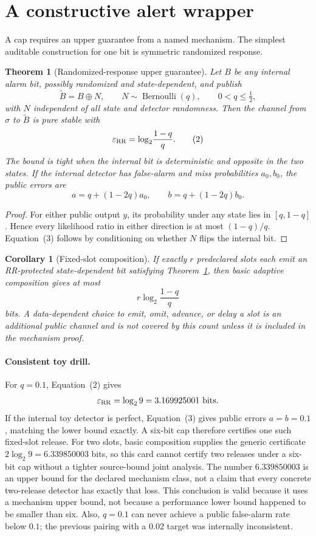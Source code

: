\documentclass[11pt]{article}
\newtheorem{theorem}{Theorem}
\newtheorem{corollary}{Corollary}
\begin{document}
\section{A constructive alert wrapper}

A cap requires an upper guarantee from a named mechanism.
The simplest auditable construction for one bit is symmetric randomized response.\cite{warner1965randomizedresponse}

\begin{theorem}[Randomized-response upper guarantee]
\label{thm:rr}
Let $B$ be any internal alarm bit, possibly randomized and state-dependent, and publish
\[
\widetilde B=B\oplus N,
\qquad N\sim\operatorname{Bernoulli}(q),
\qquad 0<q\le\tfrac12,
\]
with $N$ independent of all state and detector randomness.
Then the channel from $\sigma$ to $\widetilde B$ is pure stable with
\[
\varepsilon_{\rm RR}=\log_2\!\frac{1-q}{q}.
\tag{2}
\]
The bound is tight when the internal bit is deterministic and opposite in the two states.
If the internal detector has false-alarm and miss probabilities $a_0,b_0$, the public errors are
\[
a=q+(1-2q)a_0,
\qquad
b=q+(1-2q)b_0.
\tag{3}
\]
\end{theorem}

\begin{proof}
For either public output $y$, its probability under any state lies in $[q,1-q]$.
Hence every likelihood ratio in either direction is at most $(1-q)/q$.
Equation~(3) follows by conditioning on whether $N$ flips the internal bit.
\end{proof}

\begin{corollary}[Fixed-slot composition]
If exactly $r$ predeclared slots each emit an RR-protected state-dependent bit satisfying Theorem~\ref{thm:rr}, then basic adaptive composition gives at most
\[
r\log_2\!\frac{1-q}{q}
\]
bits.
A data-dependent choice to emit, omit, advance, or delay a slot is an additional public channel and is not covered by this count unless it is included in the mechanism proof.
\end{corollary}

\paragraph{Consistent toy drill.}
For $q=0.1$, Equation~(2) gives
\[
\varepsilon_{\rm RR}=\log_2 9=3.169925001\text{ bits}.
\]
If the internal toy detector is perfect, Equation~(3) gives public errors $a=b=0.1$, matching the lower bound exactly.
A six-bit cap therefore certifies one such fixed-slot release.  For two slots, basic composition supplies the generic certificate
$2\log_2 9=6.339850003$ bits, so this card cannot certify two releases under a six-bit cap without a tighter source-bound joint analysis.
The number $6.339850003$ is an upper bound for the declared mechanism class, not a claim that every concrete two-release detector has exactly that loss.
This conclusion is valid because it uses a mechanism upper bound, not because a performance lower bound happened to be smaller than six.
Also, $q=0.1$ can never achieve a public false-alarm rate below $0.1$; the previous pairing with a $0.02$ target was internally inconsistent.
\end{document}
